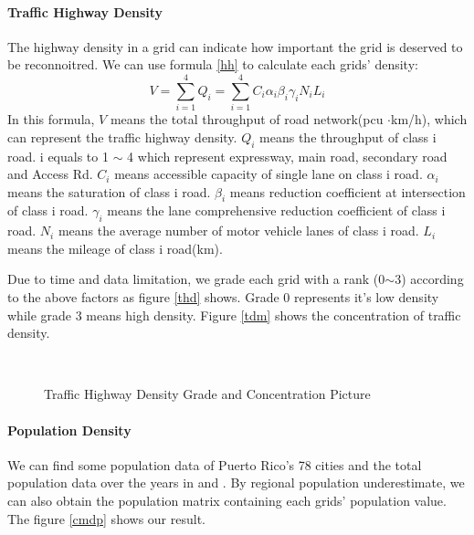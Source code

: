 \documentclass{mcmthesis}
\begin{document}
   \paragraph{Traffic Highway Density }
   The highway density in a grid can indicate how important the grid is deserved to be reconnoitred. We can use formula \ref{hh} to calculate each grids' density\cite{2}:
   \begin{equation}  \label{hh}
   V=\sum\limits_{i=1}^4{Q_i}= \sum\limits_{i=1}^4 {C_i\alpha_i\beta_i\gamma_iN_iL_i}
   \end{equation}
   In this formula, $V$ means the total throughput of road network(pcu
   ${{\cdot}}$km/h), which can represent the traffic highway density. $Q_i$ means the throughput of class i road. i equals to 1 $\sim$ 4 which represent expressway, main road, secondary road and Access Rd. $C_i$ means accessible capacity of single lane on class i road. $\alpha_i$ means the saturation of class i road. $\beta_i$ means reduction coefficient at intersection of class i road. $\gamma_i$ means the lane comprehensive reduction coefficient of class i road. $N_i$ means the average number of motor vehicle lanes of class i road. $L_i$ means the mileage of class i road(km).  
   
   Due to time and data limitation, we grade each grid with a rank (0$\sim$3) according to the above factors as figure \ref{thd} shows. Grade 0 represents it's low density while grade 3 means high density. Figure \ref{tdm} shows the concentration of traffic density.
	   \begin{figure}[!htbp]                               
		\centering
		\qquad
		\\ 
	\caption{Traffic Highway Density Grade and Concentration Picture}                             
\end{figure}
    \paragraph{Population Density}
    We can find some population data of Puerto Rico's 78 cities and the total population data over the years in \cite{3} and \cite{4}. By regional population underestimate, we can also obtain the population matrix containing each grids' population value. The figure \ref{cmdp} shows our result. \par
    
\end{document}
